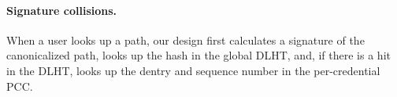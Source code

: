




\paragraph{Signature collisions.}
When a user looks up a path, our design first calculates a signature
of the canonicalized path, looks up the hash in the global DLHT,
and, if there is a hit in the DLHT, 
looks up the dentry and sequence number in the per-credential PCC.

